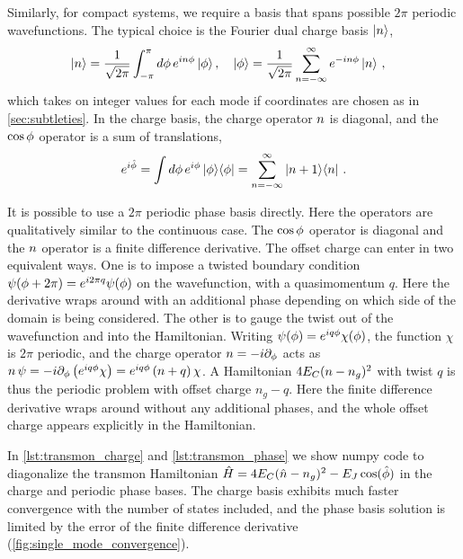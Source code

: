 Similarly, for compact systems, we require a basis that spans possible $2\pi$ periodic wavefunctions.
The typical choice is the Fourier dual charge basis $\ket{n}$,
\begin{align}
         &\ket{n} 
         = 
         \frac {1}{\sqrt{2\pi}}
         \int_{-\pi}^{\pi} d\phi \,
         e^{i n  \phi} \ket{\phi} 
         , \quad \ket{\phi} 
         = 
         \frac {1}{\sqrt{2\pi}} 
         \sum_{n =-\infty}^\infty 
         e^{-i n  \phi} \ket{n}
         \, ,
\end{align}
which takes on integer values for each mode if coordinates are chosen as in \cref{sec:subtleties}.
In the charge basis, the charge operator $n$ is diagonal, and the  $\cos \phi$ operator is a sum of translations,
\begin{align}
e^{i  \hat {\phi}}
        = 
        \int d\phi \, e^{i \phi} \ket{\phi}\!\bra{\phi}
        = 
        \sum_{n =-\infty}^{\infty} \ket{n  + 1}\!\bra{n}  \, .
\end{align}

It is possible to use a $2\pi$ periodic phase basis directly.
Here the operators are qualitatively similar to the continuous case. The $\cos \phi$ operator is diagonal and the $n$ operator is a finite difference derivative.
The offset charge can enter in two equivalent ways.
One is to impose a twisted boundary condition $\psi(\phi + 2\pi) = e^{i 2\pi q} \psi(\phi)$ on the wavefunction, with a quasimomentum $q$.
Here the derivative wraps around with an additional phase depending on which side of the domain is being considered.
The other is to gauge the twist out of the wavefunction and into the Hamiltonian.
Writing $\psi(\phi) = e^{i q \phi} \chi(\phi)$, the function $\chi$ is $2\pi$ periodic, and the charge operator $n = -i\partial_\phi$ acts as $n \, \psi = -i \partial_\phi \left( e^{i q \phi} \chi \right) = e^{i q \phi} \left( n + q \right) \chi$.
A Hamiltonian $4 E_C (n - n_g)^2$ with twist $q$ is thus the periodic problem with offset charge $n_g - q$.
Here the finite difference derivative wraps around without any additional phases, and the whole offset charge appears explicitly in the Hamiltonian.

In \cref{lst:transmon_charge} and \cref{lst:transmon_phase} we show numpy code to diagonalize the transmon Hamiltonian $\hat H = 4 E_C (\hat{n} - n_g)^2 - E_J\cos(\hat{\phi})$ in the charge and periodic phase bases.
The charge basis exhibits much faster convergence with the number of states included, and the phase basis solution is limited by the error of the finite difference derivative (\cref{fig:single_mode_convergence}).

